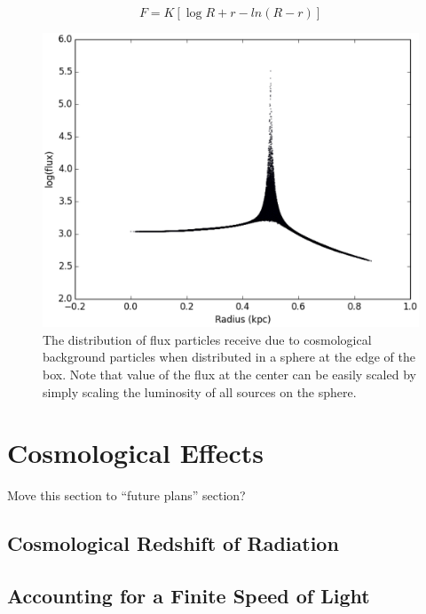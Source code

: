 \begin{equation}
\label{eq:shellflux}
F = K\left[ \log{R+r} - ln(R-r) \right]
\end{equation}

\begin{figure}
\includegraphics[width=\textwidth]{graphics/backgroundflux.eps}
\caption[Flux due to the cosmological background.]{The distribution of flux particles receive due to cosmological background particles when distributed in a sphere at the edge of the box. Note that value of the flux at the center can be easily scaled by simply scaling the luminosity of all sources on the sphere.}
\label{fig:backgroundflux}
\end{figure}

\section{Cosmological Effects}
\label{sec:cosmoeffects}
Move this section to ``future plans'' section?

\subsection{Cosmological Redshift of Radiation}
\label{sec:redshiftingradiation}


\subsection{Accounting for a Finite Speed of Light}
\label{sec:finitespeedoflight}

